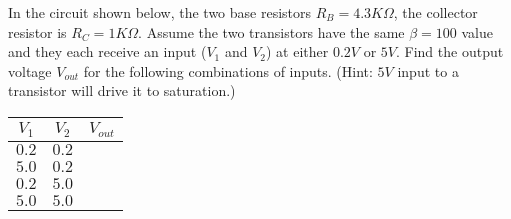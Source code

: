 \begin{enumerate}

  \begin{comment}
  {\bf Solution:}
  \[
  \frac{V^--V}{R_1}+\frac{V_0-V}{R_2}=0,\;\;\;\;\;\;
  \frac{V^+-V}{R_3}+\frac{V_0-V}{R_4}=\frac{V}{R_L};
  \]
  Solving the first equation for $V_0-V$:
  \[
  V_0-V=(V-V^-)\frac{R_2}{R_1}=(V-V^-)\frac{R_4}{R_3}
  \]
  and substituting into the second equation, we get:
  \[
  \frac{V^+-V}{R_3}+\frac{V-V^-}{R_3}
  =\frac{V^+-V^-}{R_3}=\frac{V}{R_L}
  \]
  Solving the last equation for $V$ we get
  \[
  V=\frac{R_L}{R_3}(V^+-V^-)
  \]
  and the current through $R_L$ is:
  \[
  I_L=\frac{V}{R_L}=\frac{V^+-V^-}{R_3}
  \]
  which is a constant independent of $R_L$.
  \end{comment}

\end{enumerate}



\item In the circuit shown below, the two base resistors $R_B=4.3K\Omega$,
the collector resistor is $R_C=1K\Omega$. Assume the two transistors
have the same $\beta=100$ value and they each receive an input ($V_1$ and
$V_2$) at either $0.2V$ or $5V$. Find the output voltage $V_{out}$ for
the following combinations of inputs. (Hint: $5V$ input to a transistor
will drive it to saturation.)

\begin{tabular}{cc|c}\hline
$V_1$ & $V_2$ & $V_{out}$ \\ \hline
  $0.2$ & $0.2$ &         \\
  $5.0$ & $0.2$ &         \\
  $0.2$ & $5.0$ &         \\
  $5.0$ & $5.0$ &         \hline
\end{tabular}






